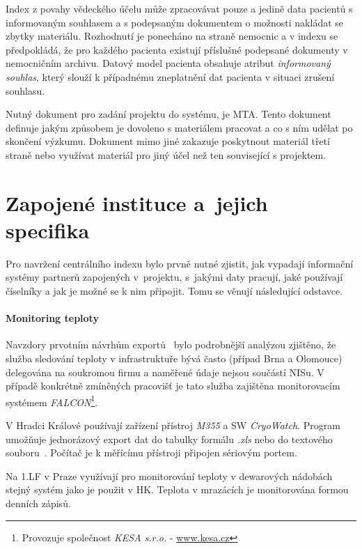 Index \ProjectName z povahy vědeckého účelu může zpracovávat pouze a jedině data pacientů s informovaným souhlasem a s podepsaným dokumentem o možnosti nakládat se zbytky materiálu. Rozhodnutí je ponecháno na straně nemocnic a v indexu se předpokládá, že pro každého pacienta existují příslušné podepsané dokumenty v nemocničním archivu.
Datový model pacienta obsahuje atribut \textit{informovaný souhlas}, který slouží k případnému zneplatnění dat pacienta v situaci zrušení souhlasu.

Nutný dokument pro zadání projektu do systému, je MTA. Tento dokument definuje jakým způsobem je dovoleno s materiálem pracovat a co s ním udělat po skončení výzkumu. Dokument mimo jiné zakazuje poskytnout materiál třetí straně nebo využívat materiál pro jiný účel než ten související s projektem.

\section{Zapojené instituce a~jejich specifika}\label{sec:instituce}
Pro navržení centrálního indexu bylo prvně nutné zjistit, jak vypadají informační systémy partnerů zapojených v~projektu, s~jakými daty pracují, jaké používají číselníky a jak je možné se k nim připojit. Tomu se věnují následující odstavce.

\paragraph*{Monitoring teploty}
Navzdory prvotním návrhům exportů~\cite{ARCH_2011_12_29} bylo podrobnější analýzou zjištěno, že služba sledování teploty v infrastruktuře bývá často (případ Brna a Olomouce) delegována na soukromou firmu a naměřené údaje nejsou součástí NISu. V případě konkrétně zmíněných pracovišť je tato služba zajištěna monitorovacím systémem \textit{FALCON}\footnote{Provozuje společnost \textit{KESA s.r.o.} - \url{www.kesa.cz}}.

V Hradci Králové používají zařízení přístroj \textit{M355} a SW \textit{CryoWatch}. Program umožňuje jednorázový export dat do tabulky formálu \textit{.xls} nebo do textového souboru~\cite{M355CE}.
Počítač je k měřícímu přístroji připojen sériovým portem.

Na 1.LF v Praze využívají pro monitorování teploty v dewarových nádobách stejný systém jako je použit v HK. Teplota v mrazácích je monitorována formou denních zápisů.


